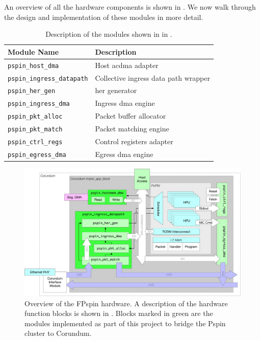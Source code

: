 An overview of all the hardware components is shown in .  We now walk through the design and implementation of these modules in more detail.

\begin{table}[ht]
    \centering
    \begin{tabular}{ll}
    \toprule
    Module Name & Description \\ \midrule
    \texttt{pspin\_host\_dma} & Host ac{dma} adapter \\
    \texttt{pspin\_ingress\_datapath} & Collective ingress data path wrapper \\
    \texttt{pspin\_her\_gen} & \ac{her} generator \\
    \texttt{pspin\_ingress\_dma} & Ingress \ac{dma} engine \\
    \texttt{pspin\_pkt\_alloc} & Packet buffer allocator \\
    \texttt{pspin\_pkt\_match} & Packet matching engine \\
    \texttt{pspin\_ctrl\_regs} & Control registers adapter \\
    \texttt{pspin\_egress\_dma} & Egress \ac{dma} engine \\
    \bottomrule
    \end{tabular}
    \caption{Description of the modules shown in in .} \label{tab:mod-name-desc}
\end{table}

\begin{figure}
    \centering
    \includegraphics[width=\linewidth]{figures/hw-overview.pdf}
    \caption{Overview of the FP\acs{spin} hardware.  A description of the hardware function blocks is shown in .  Blocks marked in green are the modules implemented as part of this project to bridge the P\acs{spin} cluster to Corundum.}
    \label{fig:hw-overview}
\end{figure}

